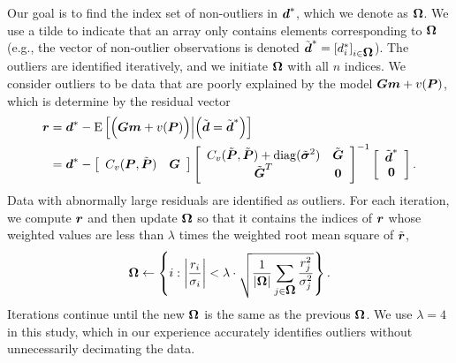 \documentclass[extra,mreferee]{gji}
\begin{document}
Our goal is to find the index set of non-outliers in $\mitbf{d}^*$, which we denote as $\mitbf{\Omega}$. We use a tilde to indicate that an array only contains elements corresponding to $\mitbf{\Omega}$ (e.g., the vector of non-outlier observations is denoted $\tilde{\mitbf{d}}^* = [d_i^*]_{i \in \mitbf{\Omega}}$). The outliers are identified iteratively, and we initiate $\mitbf{\Omega}$ with all $n$ indices. We consider outliers to be data that are poorly explained by the model $\mitbf{G}\mitbf{m} + v(\mitbf{P})$, which is determine by the residual vector 
\begin{align}\label{eq:Residual}
\mitbf{r} &= \mitbf{d}^* - \mathrm{E}\left[\Big(\mitbf{G}\mitbf{m} + v(\mitbf{P})\Big) \Big| \Big(\tilde{\mitbf{d}} = \tilde{\mitbf{d}}^*\Big)\right] \\
          &= \mitbf{d}^*  - 
            \left[\begin{array}{cc}
                  C_v(\mitbf{P},\tilde{\mitbf{P}}) & \mitbf{G} \nonumber \\
                  \end{array}\right]
            \left[\begin{array}{cc}
                  C_v(\tilde{\mitbf{P}},\tilde{\mitbf{P}}) + \mathrm{diag}(\tilde{\mitbf{\sigma}}^2) & \tilde{\mitbf{G}} \\
                  \tilde{\mitbf{G}}^T  & \mitbf{0} \\
                  \end{array}\right]^{-1}
            \left[\begin{array}{c}
                  \tilde{\mitbf{d}}^* \\
                  \mitbf{0} \\
                  \end{array}\right].
\end{align}
Data with abnormally large residuals are identified as outliers. For each iteration, we compute $\mitbf{r}$ and then update $\mitbf{\Omega}$ so that it contains the indices of $\mitbf{r}$ whose weighted values are less than $\lambda$ times the weighted root mean square of $\tilde{\mitbf{r}}$, 
\begin{equation}\label{eq:Update}
\mitbf{\Omega} \leftarrow \left\{i : \left|\frac{r_i}{\sigma_i}\right| < \lambda \cdot \sqrt{\frac{1}{|\mitbf{\Omega}|} \sum_{j \in \mitbf{\Omega}} \frac{r_j^2}{\sigma_j^2}} \right\}.
\end{equation} 
Iterations continue until the new $\mitbf{\Omega}$ is the same as the previous $\mitbf{\Omega}$. We use $\lambda=4$ in this study, which in our experience accurately identifies outliers without unnecessarily decimating the data.
\end{document}
